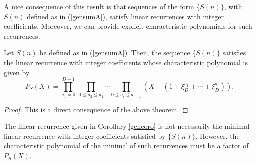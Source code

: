 A nice consequence of this result is that sequences of the form $\{S(n)\}$, with $S(n)$ defined as in (\ref{gensumA}), satisfy linear recurrences with integer coefficients. Moreover, we can 
provide explicit characteristic polynomials for such recurrences.

\begin{corollary}
\label{gencoro}
 Let $S(n)$ be defined as in (\ref{gensumA}).  Then, the sequence $\{S(n)\}$ satisfies the linear recurrence with integer coefficients whose characteristic polynomial is given by
 \begin{equation}
  P_S(X)=\prod_{a_1=0}^{D-1}\,\prod_{0\leq a_2\leq a_1} \cdots \prod_{0\leq a_r\leq a_{r-1}} \left(X-(1+\xi_D^{a_1}+\cdots+\xi_D^{a_r})\right).
 \end{equation}
\end{corollary}

\begin{proof}
This is a direct consequence of the above theorem. 
\end{proof}

The linear recurrence given in Corollary \ref{gencoro} is not necessarily the minimal linear recurrence with integer coefficients satisfied by $\{S(n)\}$.  However, the characteristic polynomial of the 
minimal of such recurrences must be a factor of $P_S(X)$.

